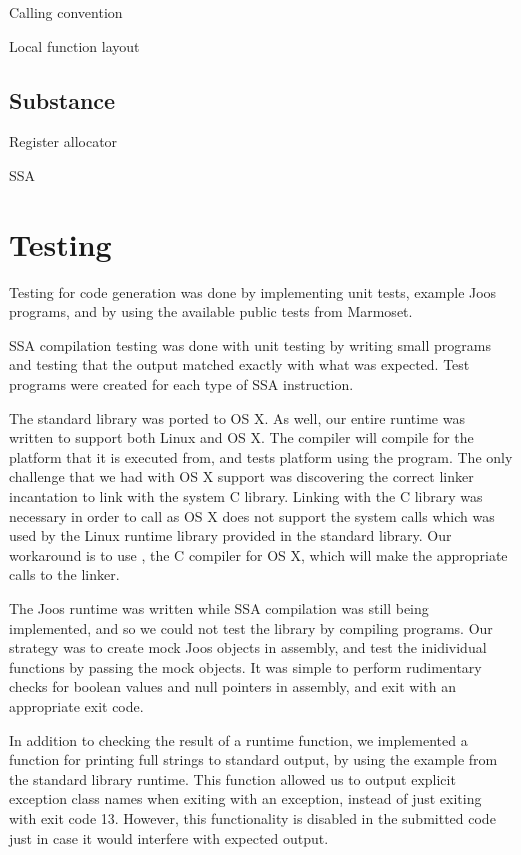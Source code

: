 \documentclass[pdftex,11pt,a4paper]{article}
\begin{document}
Calling convention

Local function layout


\subsection{Substance}

Register allocator

SSA


\section{Testing}

Testing for code generation was done by implementing unit tests,
example Joos programs, and by using the available public tests from
Marmoset.

SSA compilation testing was done with unit testing by writing small
programs and testing that the output matched exactly with what was
expected. Test programs were created for each type of SSA
instruction.

The standard library  was ported to OS X. As well, our
entire runtime was written to support both  Linux and  OS
X. The compiler will compile for the platform that it is executed
from, and tests platform using the  program. The only
challenge that we had with OS X support was discovering the correct
linker incantation to link with the system C library. Linking with the
C library was necessary in order to call  as OS X does not
support the system calls which was used by the Linux runtime library
provided in the standard library. Our workaround is to use
, the C compiler for OS X, which will make the appropriate
calls to the linker.

The Joos runtime was written while SSA compilation was still being
implemented, and so we could not test the library by compiling
programs. Our strategy was to create mock Joos objects in assembly,
and test the inidividual functions by passing the mock objects. It was
simple to perform rudimentary checks for boolean values and null
pointers in assembly, and exit with an appropriate exit code.

In addition to checking the result of a runtime function, we
implemented a function for printing full strings to standard output,
by using the example from the standard library runtime. This function
allowed us to output explicit exception class names when exiting with
an exception, instead of just exiting with exit code 13. However, this
functionality is disabled in the submitted code just in case it would
interfere with expected output.
\end{document}
